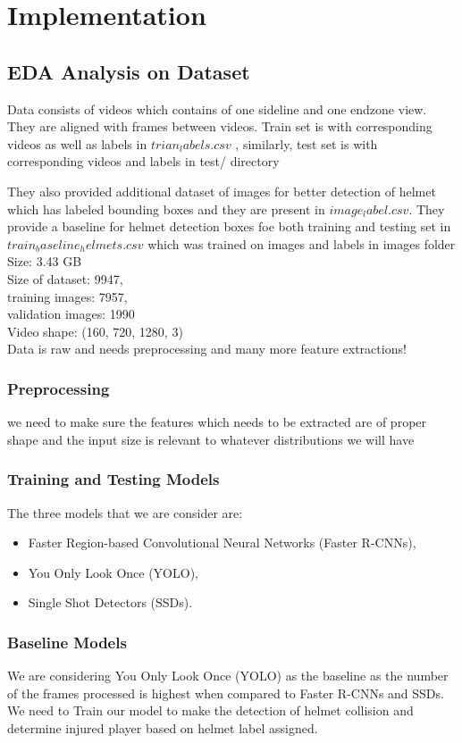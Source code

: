 \documentclass{article}
\begin{document}
\section{Implementation}
\label{headings}

\subsection{EDA Analysis on Dataset }

Data consists of videos which contains of one sideline and one endzone view. They are aligned with frames between videos. Train set is with corresponding videos as well as labels in ${trian_labels.csv}$ , similarly, test set is with corresponding videos and labels in test/ directory 

They also provided additional dataset of images for better detection of helmet which has labeled bounding boxes and they are present in ${image_label.csv}$.
They provide a baseline for helmet detection boxes foe both training and testing set in ${train_baseline_helmets.csv}$ which was trained on images and labels in images folder
Size: 3.43 GB\\
Size of dataset: 9947,   \\    training images: 7957,      \\ validation images: 1990\\
Video shape: (160, 720, 1280, 3)\\
Data is raw and needs preprocessing and many more feature extractions! 

\subsubsection{Preprocessing}
we need to make sure the features which needs to be extracted are of proper shape and the input size is relevant to whatever distributions we will have
\subsubsection{Training and Testing Models}
The three models that we are consider are:
\begin{itemize}
\item Faster Region-based Convolutional Neural Networks (Faster R-CNNs),
\item You Only Look Once (YOLO),
\item Single Shot Detectors (SSDs).
\end{itemize}
\subsubsection{Baseline Models}
 We are considering You Only Look Once (YOLO) as the baseline as the number of the frames processed is highest when compared to Faster R-CNNs and SSDs.
We need to Train our model to make the detection of helmet collision and determine injured player based on helmet label assigned.
\end{document}
